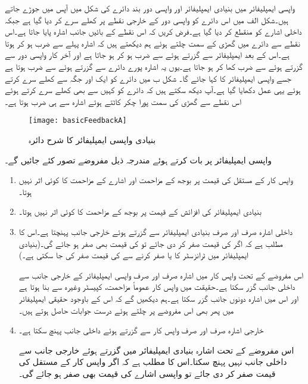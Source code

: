 واپسی ایمپلیفائر میں بنیادی ایمپلیفائر اور واپسی دور بند دائرے کی شکل میں آپس میں جوڑے جاتے ہیں۔شکل  الف میں اس دائرے کو واپسی دور کے خارجی نقطے   پر کھلے سرے کر دیا گیا ہے جبکہ داخلی اشارے کو منقطع کر دیا گیا ہے۔فرض کریں کہ اس نقطے  کے بائیں جانب اشارہ  پایا جاتا ہے۔اس نقطے  سے دائرے میں گھڑی کے سمت چلتے ہوئے ہم دیکھتے ہیں کہ اشارہ  پہلے  سے ضرب ہو کر  ہوتا ہے۔اس کے بعد ایمپلیفائر سے گزرتے ہوئے  سے ضرب ہو کر  ہو جاتا ہے اور آخر کار واپسی دور سے گزرتے ہوئے  سے ضرب کھا کر  ہو جاتا ہے۔یوں یہ اشارہ پورے دائرے سے گزرتے ہوئے  سے ضرب ہوتا ہے جسے واپسی ایمپلیفائر کا  کہا جائے گا۔ شکل  ب میں دائرے کو ایک اور جگہ سے کھلے سرے کرتے ہوئے یہی عمل دکھایا گیا ہے۔آپ دیکھ سکتے ہیں کہ دائرے کو کہیں سے بھی کھلے سرے کرتے ہوئے اس نقطے  سے گھڑی کی سمت پورا چکر کاٹتے ہوئے اشارہ  سے ہی ضرب ہوتا ہے۔
\begin{figure}
\centering
\texttt{[image: basicFeedbackA]}
\caption{بنیادی واپسی ایمپلیفائر کا شرح دائرہ}
\label{شکل_بنیادی_واپسی_ایمپلیفائر_شرح_دائرہ}
\end{figure}

واپسی ایمپلیفائر پر بات کرتے ہوئے مندرجہ ذیل مفروضے  تصور کئے جائیں گے۔

\begin{enumerate}

\item
واپس کار کے مستقل  کی قیمت پر بوجھ کے مزاحمت  اور اشارے کے مزاحمت  کا کوئی اثر نہیں ہوتا۔
\item
بنیادی ایمپلیفائر کی افزائش  کے قیمت پر بوجھ کے مزاحمت  کا کوئی اثر نہیں ہوتا۔
\item
داخلی اشارہ صرف اور صرف بنیادی ایمپلیفائر سے گزرتے ہوئے خارجی جانب پہنچتا ہے۔اس کا مطلب ہے کہ اگر  کی قیمت صفر کر دی جائے تو  کی قیمت بھی صفر ہو جائے گی۔(بنیادی ایمپلیفائر میں ٹرانزسٹر کا  یا  صفر کرنے سے   کی قیمت صفر کی جا سکتی ہے۔)

اس مفروضے کے تحت واپس کار میں اشارہ صرف اور صرف واپسی ایمپلیفائر کے خارجی جانب سے داخلی جانب گزر سکتا ہے۔حقیقت میں واپس کار عموماً مزاحمت، کپیسٹر وغیرہ سے بنا ہوتا ہے اور اس میں اشارہ دونوں جانب گزر سکتا ہے۔ہم دیکھیں گے کہ اس کے باوجود حقیقی ایمپلیفائر میں پھر بھی اس مفروضے پر چلتے ہوئے درست جوابات حاصل ہوتے ہیں۔
\item
خارجی اشارہ صرف اور صرف واپس کار سے گزرتے ہوئے داخلی جانب پہنچ سکتا ہے۔

اس مفروضے کے تحت اشارہ بنیادی ایمپلیفائر میں گزرتے ہوئے خارجی جانب سے داخلی جانب نہیں پہنچ سکتا۔اس کا مطلب ہے کہ اگر واپس کار کے مستقل  کی  قیمت صفر کر دی جائے تو واپسی اشارے کی قیمت بھی صفر ہو جائے گی۔
\end{enumerate}

